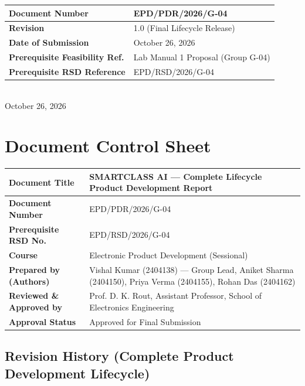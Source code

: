 \documentclass[11pt,a4paper]{article}
\begin{document}
\begin{titlepage}
\vfill

\begin{tabular}{|p{6.5cm}|p{8.5cm}|}
\hline
\textbf{Document Number} & EPD/PDR/2026/G-04 \\ \hline
\textbf{Revision} & 1.0 (Final Lifecycle Release) \\ \hline
\textbf{Date of Submission} & October 26, 2026 \\ \hline
\textbf{Prerequisite Feasibility Ref.} & Lab Manual 1 Proposal (Group G-04) \\ \hline
\textbf{Prerequisite RSD Reference} & EPD/RSD/2026/G-04 \\ \hline
\end{tabular}\\[0.5cm]

{\normalsize October 26, 2026}

\end{titlepage}

\newpage
\section*{Document Control Sheet}

\begin{table}[h!]
\centering
\begin{tabular}{|p{5.5cm}|p{9.5cm}|}
\hline
\textbf{Document Title} & SMARTCLASS AI — Complete Lifecycle Product Development Report \\ \hline
\textbf{Document Number} & EPD/PDR/2026/G-04 \\ \hline
\textbf{Prerequisite RSD No.} & EPD/RSD/2026/G-04 \\ \hline
\textbf{Course} & Electronic Product Development (Sessional) \\ \hline
\textbf{Prepared by (Authors)} & Vishal Kumar (2404138) — Group Lead, Aniket Sharma (2404150), Priya Verma (2404155), Rohan Das (2404162) \\ \hline
\textbf{Reviewed \& Approved by} & Prof. D. K. Rout, Assistant Professor, School of Electronics Engineering \\ \hline
\textbf{Approval Status} & Approved for Final Submission \\ \hline
\end{tabular}
\end{table}

\subsection*{Revision History (Complete Product Development Lifecycle)}
\end{document}
